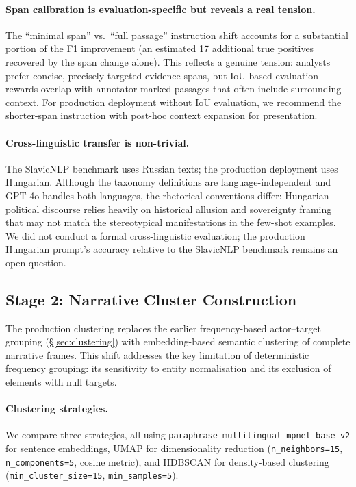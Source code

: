 \documentclass[10pt, a4paper]{article}
\begin{document}
\paragraph{Span calibration is evaluation-specific but reveals a real tension.}
The ``minimal span'' vs.\ ``full passage'' instruction shift accounts for a substantial portion of the F1 improvement (an estimated 17 additional true positives recovered by the span change alone). This reflects a genuine tension: analysts prefer concise, precisely targeted evidence spans, but IoU-based evaluation rewards overlap with annotator-marked passages that often include surrounding context. For production deployment without IoU evaluation, we recommend the shorter-span instruction with post-hoc context expansion for presentation.

\paragraph{Cross-linguistic transfer is non-trivial.}
The SlavicNLP benchmark uses Russian texts; the production deployment uses Hungarian. Although the taxonomy definitions are language-independent and GPT-4o handles both languages, the rhetorical conventions differ: Hungarian political discourse relies heavily on historical allusion and sovereignty framing that may not match the stereotypical manifestations in the few-shot examples. We did not conduct a formal cross-linguistic evaluation; the production Hungarian prompt's accuracy relative to the SlavicNLP benchmark remains an open question.

\subsection{Stage 2: Narrative Cluster Construction}
\label{sec:stage2_clustering}

The production clustering replaces the earlier frequency-based actor--target grouping (\S\ref{sec:clustering}) with embedding-based semantic clustering of complete narrative frames. This shift addresses the key limitation of deterministic frequency grouping: its sensitivity to entity normalisation and its exclusion of elements with null targets.

\paragraph{Clustering strategies.}
We compare three strategies, all using \texttt{paraphrase-multilingual-mpnet-base-v2} for sentence embeddings, UMAP for dimensionality reduction (\texttt{n\_neighbors=15}, \texttt{n\_components=5}, cosine metric), and HDBSCAN for density-based clustering (\texttt{min\_cluster\_size=15}, \texttt{min\_samples=5}).
\end{document}
